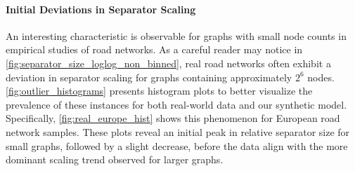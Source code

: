 \paragraph{Initial Deviations in Separator Scaling}

An interesting characteristic is observable for graphs with small node counts in empirical studies of road networks.
As a careful reader may notice in \cref{fig:separator_size_loglog_non_binned}, real road networks often exhibit a deviation in separator scaling for graphs containing approximately \(2^6\) nodes.
\cref{fig:outlier_histograms} presents histogram plots to better visualize the prevalence of these instances for both real-world data and our synthetic model.
Specifically, \cref{fig:real_europe_hist} shows this phenomenon for European road network samples.
These plots reveal an initial peak in relative separator size for small graphs, followed by a slight decrease, before the data align with the more dominant scaling trend observed for larger graphs.

